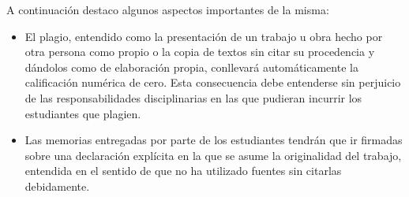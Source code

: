 A continuación destaco algunos aspectos importantes de la misma:
\begin{itemize}
\item El plagio, entendido como la presentación de un trabajo u obra hecho por otra persona como propio o la copia de textos sin citar su procedencia y dándolos como de elaboración propia, conllevará automáticamente la calificación numérica de cero. Esta consecuencia debe entenderse sin perjuicio de las responsabilidades disciplinarias en las que pudieran incurrir los estudiantes que plagien.
  \item Las memorias entregadas por parte de los estudiantes tendrán que ir firmadas sobre una declaración explícita en la que se asume la originalidad del trabajo, entendida en el sentido de que no ha utilizado fuentes sin citarlas debidamente.
\end{itemize}








